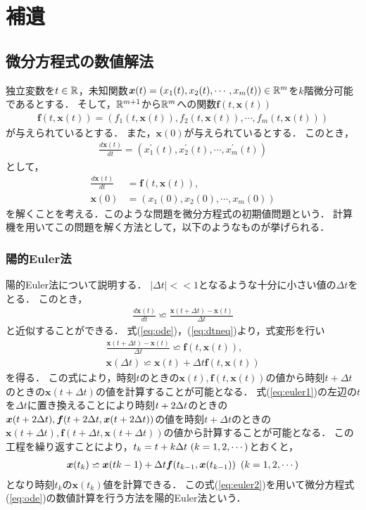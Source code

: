 \chapter{補遺}
\label{chap:補遺}
\section{微分方程式の数値解法}
独立変数を$t \in \mathbb{R}$，未知関数$\bm{x}(t) = \left(x_1(t),x_2(t),\cdots,x_m(t)\right) \in \mathbb{R}^m$を$k$階微分可能であるとする．
そして，$\mathbb{R}^{m+1}$から$\mathbb{R}^m$への関数$\bm{f}(t,\bm{x}(t))$
\begin{align}
    \bm{f}(t,\bm{x}(t)) = \left(f_1(t,\bm{x}(t)),f_2(t,\bm{x}(t)),\cdots,f_m(t,\bm{x}(t))\right)
\end{align}
が与えられているとする．
また，$\bm{x}(0)$が与えられているとする．
このとき，
\begin{align}
    \frac{d \bm{x}(t)}{dt} = \left(x_1^{\prime}(t),x_2^{\prime}(t),\cdots,x_m^{\prime}(t)\right)
\end{align}
として，
\begin{align}
    \frac{d \bm{x}(t)}{dt} &= \bm{f}(t,\bm{x}(t)), \label{eq:ode} \\
    \bm{x}(0) &= \left(x_1(0),x_2(0),\cdots,x_m(0)\right)
\end{align}
を解くことを考える．このような問題を微分方程式の初期値問題という．
計算機を用いてこの問題を解く方法として，以下のようなものが挙げられる．
\subsection{陽的Euler法}
陽的Euler法について説明する．
$|\Delta t| << 1 $となるような十分に小さい値の$\Delta t$をとる．
このとき，
\begin{align}
    \label{eq:dtneq}
    \frac{d \bm{x}(t)}{dt} \backsimeq \frac{\bm{x}(t+\Delta t) - \bm{x}(t)}{\Delta t}
\end{align}
と近似することができる．
式(\ref{eq:ode})，(\ref{eq:dtneq})より，式変形を行い
\begin{align}
    \frac{\bm{x}(t + \Delta t) - \bm{x}(t)}{\Delta t} \backsimeq \bm{f}(t,\bm{x}(t)),\\
    \bm{x}(\Delta t) \backsimeq \bm{x}(t) + \Delta t \bm{f}(t,\bm{x}(t)) \label{eq:euler1}
\end{align}
を得る．
この式により，時刻$t$のときの$\bm{x}(t),\bm{f}(t,\bm{x}(t))$の値から時刻$t+\Delta t$のときの$\bm{x}(t+\Delta t)$の値を計算することが可能となる．
式(\ref{eq:euler1})の左辺の$t$を$\Delta t$に置き換えることにより時刻$t + 2\Delta t$のときの$\bm{x}(t+2\Delta t),\bm{f}(t+2\Delta t,\bm{x}(t+2\Delta t))$の値を時刻$t+\Delta t$のときの$\bm{x}(t+\Delta t),\bm{f}(t+\Delta t,\bm{x}(t+\Delta t))$の値から計算することが可能となる．
この工程を繰り返すことにより，$t_k = t + k\Delta t \ (k = 1,2,\cdots)$とおくと，
\begin{align}
    \bm{x}(t_k) \backsimeq \bm{x}(t{k-1}) + \Delta t\bm{f}(t_{k-1},\bm{x}(t_{k-1})) \ \left(k = 1,2,\cdots\right) \label{eq:euler2}
\end{align}
となり時刻$t_k$の$\bm{x}(t_k)$値を計算できる．
この式(\ref{eq:euler2})を用いて微分方程式(\ref{eq:ode})の数値計算を行う方法を陽的Euler法という．

